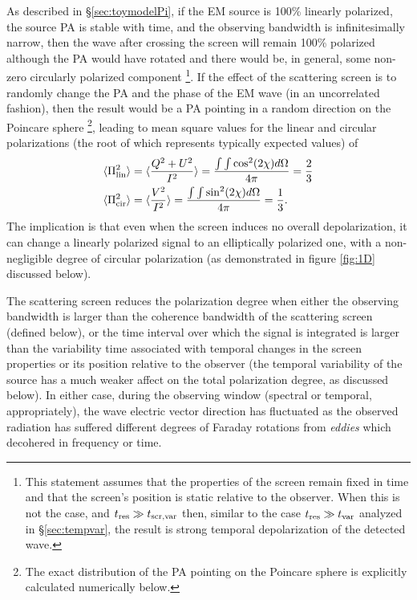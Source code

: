 \documentclass[fleqn,usenatbib]{mnras}
\begin{document}
	As described in \S \ref{sec:toymodelPi}, if the EM source is 100\% linearly polarized, the source PA is stable with time, and the observing bandwidth is infinitesimally narrow, then the wave after crossing the screen will remain 100\% polarized although the PA would have rotated and there would be, in general, some non-zero circularly polarized component \footnote{This statement assumes that the properties of the screen remain fixed in time and that the screen's position is static relative to the observer. When this is not the case, and $t_{\rm res}\gg t_{\rm scr,var}$ then, similar to the case $t_{\rm res}\gg t_{\rm var}$ analyzed in \S \ref{sec:tempvar}, the result is strong temporal depolarization of the detected wave.}. If the effect of the scattering screen is to randomly change the PA and the phase of the EM wave (in an uncorrelated fashion), then the result would be a PA pointing in a random direction on the Poincare sphere \footnote{The exact distribution of the PA pointing on the Poincare sphere is explicitly calculated numerically below.}, leading to mean square values for the linear and circular polarizations (the root of which represents typically expected values) of
	\begin{eqnarray}
		\label{eq:Poincre}
		&    \langle\Pi_{\rm lin}^2\rangle=\langle\frac{Q^2+U^2}{I^2}\rangle=\frac{\int \int \cos^2(2\chi)d\Omega}{4\pi}=\frac{2}{3}\nonumber \\ 
		&    \langle\Pi_{\rm cir}^2\rangle=\langle\frac{V^2}{I^2}\rangle=\frac{\int \int \sin^2(2\chi)d\Omega}{4\pi}=\frac{1}{3}.
	\end{eqnarray}
	The implication is that even when the screen induces no overall depolarization, it can change a linearly polarized signal to an elliptically polarized one, with a non-negligible degree of circular polarization (as demonstrated in figure \ref{fig:1D} discussed below).
	
	
	The scattering screen reduces the polarization degree when either the observing bandwidth is larger than the coherence bandwidth of the scattering screen (defined below), or the time interval over which the signal is integrated is larger than the variability time associated with temporal changes in the screen properties or its position relative to the observer (the temporal variability of the source has a much weaker affect on the total polarization degree, as discussed below). In either case, during the observing window (spectral or temporal, appropriately), the wave electric vector direction has fluctuated as the observed radiation has suffered different degrees of Faraday rotations from {\it eddies} which decohered in frequency or time. 
	
\end{document}
